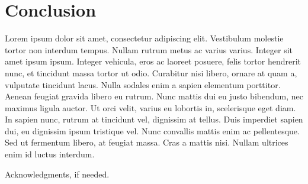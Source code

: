 \documentclass{sigplanconf}
\begin{document}
\section{Conclusion}

Lorem ipsum dolor sit amet, consectetur adipiscing elit. Vestibulum molestie tortor non interdum tempus. Nullam rutrum metus ac varius varius. Integer sit amet ipsum ipsum. Integer vehicula, eros ac laoreet posuere, felis tortor hendrerit nunc, et tincidunt massa tortor ut odio. Curabitur nisi libero, ornare at quam a, vulputate tincidunt lacus. Nulla sodales enim a sapien elementum porttitor. Aenean feugiat gravida libero eu rutrum. Nunc mattis dui eu justo bibendum, nec maximus ligula auctor. Ut orci velit, varius eu lobortis in, scelerisque eget diam. In sapien nunc, rutrum at tincidunt vel, dignissim at tellus. Duis imperdiet sapien dui, eu dignissim ipsum tristique vel. Nunc convallis mattis enim ac pellentesque. Sed ut fermentum libero, at feugiat massa. Cras a mattis nisi. Nullam ultrices enim id luctus interdum.

%

\acks

Acknowledgments, if needed.




%
%
\end{document}
